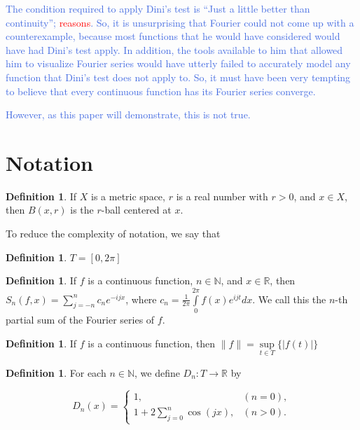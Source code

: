 \documentclass{amsart}
\newcommand{\N}{\mathbb{N}}
\newcommand{\R}{\mathbb{R}}
\newcommand{\colorcomment}[2]{\textcolor{#1}{#2}} %
\newcommand{\absval}[1]{\lvert #1 \rvert}
\newcommand{\norm}[1]{\|#1\|}
\theoremstyle{definition}
\newtheorem{definition}[thm]{Definition}
\begin{document}
\colorcomment{RoyalBlue}{The condition required to apply Dini's test is ``Just a little better than continuity''; \colorcomment{red}{reasons}. 
So, it is unsurprising that Fourier could not come up with a counterexample, because most functions that he would have considered would have had Dini's test apply. 
In addition, the tools available to him that allowed him to visualize Fourier series would have utterly failed to accurately model any function that Dini's test does not apply to. 
So, it must have been very tempting to believe that every continuous function has its Fourier series converge.}

\colorcomment{RoyalBlue}{However, as this paper will demonstrate, this is not true.}

\section{Notation}

\begin{definition}
If $X$ is a metric space, $r$ is a real number with $r>0$, and $x \in X$, then $B(x,r)$ is the $r$-ball centered at $x$.
\end{definition}

To reduce the complexity of notation, we say that

\begin{definition}
$T = [0, 2 \pi]$
\end{definition}

\begin{definition}
If $f$ is a continuous function, $n \in \N$, and $x \in \R$, then $S_n(f,x) = \sum\limits_{j=-n}^n c_n e^{-ijx}$, where $c_n = \frac{1}{2 \pi} \int\limits_0^{2\pi} f(x)e^{ijt} dx$. We call this the $n$-th partial sum of the Fourier series of $f$.
\end{definition}

\begin{definition}
If $f$ is a continuous function, then $\norm{f} = \sup\limits_{t \in T} \{\absval{f(t)}\}$
\end{definition}

\begin{definition}
For each $n \in \N$, we define $D_n: T \to \R$ by


\begin{displaymath}
   D_n(x) = \left\{
     \begin{array}{lr}
       1, &(n=0),\\
       1+ 2\sum\limits_{j=0}^n \cos(j x), &(n > 0).
     \end{array}
   \right.
\end{displaymath} 
\end{definition}
\end{document}
